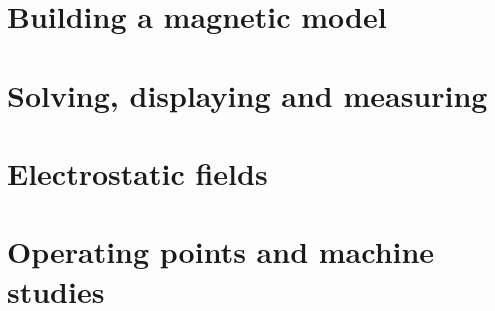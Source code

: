 \documentclass[a4paper,11pt]{ltxdoc}
\begin{document}
\part{Building a magnetic model}

















\part{Solving, displaying and measuring}








\part{Electrostatic fields}









\part{Operating points and machine studies}







\end{document}
